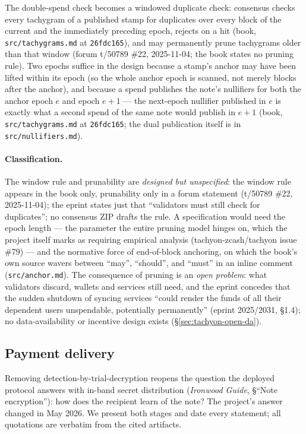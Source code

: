 \documentclass[11pt,a4paper]{article}
\theoremstyle{definition}
\begin{document}
The double-spend check becomes a windowed duplicate check: consensus checks
every tachygram of a published stamp for duplicates over every block of the
current and the immediately preceding epoch, rejects on a hit (book,
\texttt{src/tachygrams.md} at \texttt{26fdc165}), and may permanently
prune tachygrams older than that window (forum t/50789 \#22, 2025-11-04;
the book states no pruning rule). Two epochs suffice in the
design because a stamp's anchor may have been lifted within its epoch (so
the whole anchor epoch is scanned, not merely blocks after the anchor), and
because a spend publishes the note's nullifiers for both the anchor epoch
$e$ and epoch $e + 1$ --- the next-epoch nullifier published in $e$ is
exactly what a second spend of the same note would publish in $e + 1$
(book, \texttt{src/tachygrams.md} at \texttt{26fdc165}; the dual
publication itself is in \texttt{src/nullifiers.md}).

\paragraph{Classification.} The window rule and prunability are
\emph{designed but unspecified}: the window rule appears in the book only,
prunability only in a forum statement (t/50789 \#22, 2025-11-04); the
eprint states just that ``validators must still check for duplicates''; no
consensus ZIP drafts the rule. A specification would need the epoch length
--- the parameter the entire pruning model hinges on, which the project
itself marks as requiring empirical analysis (tachyon-zcash/tachyon issue
\#79) --- and the normative force of end-of-block anchoring, on which the
book's own source wavers between ``may'', ``should'', and ``must'' in an
inline comment (\texttt{src/anchor.md}). The consequence of
pruning is an \emph{open problem}: what validators discard, wallets and
services still need, and the eprint concedes that the sudden shutdown of
syncing services ``could render the funds of all their dependent users
unspendable, potentially permanently'' (eprint 2025/2031, \S1.4); no
data-availability or incentive design exists (\S\ref{sec:tachyon-open-da}).

\subsection{Payment delivery}\label{sec:tachyon-payments}

Removing detection-by-trial-decryption reopens the question the deployed
protocol answers with in-band secret distribution (\emph{Ironwood Guide},
\S``Note encryption''): how does the recipient learn of
the note? The project's
answer changed in May 2026. We present both stages and date every statement;
all quotations are verbatim from the cited artifacts.
\end{document}
